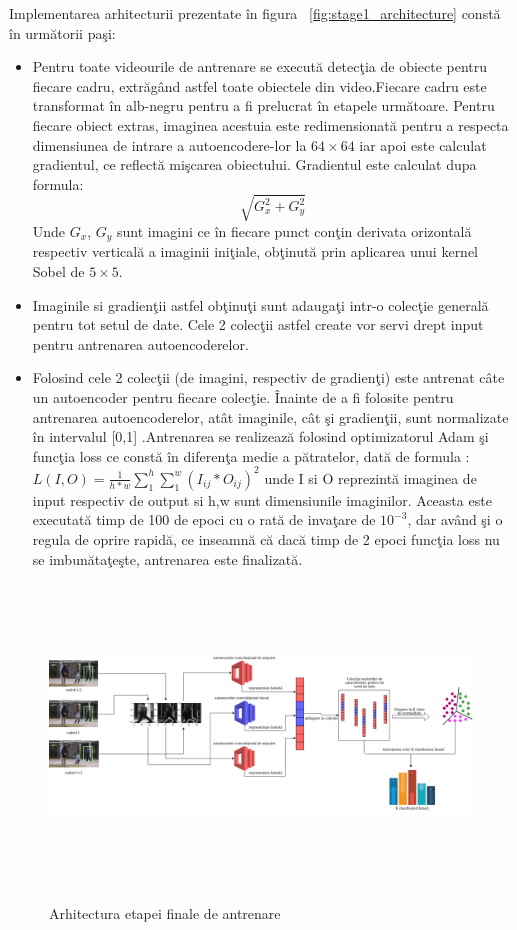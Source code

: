 \documentclass[a4paper,12pt]{report}
\begin{document}
\par
Implementarea arhitecturii prezentate în figura ~\ref{fig:stage1_architecture} constă în următorii paşi:
\begin {itemize}
\item Pentru toate videourile de antrenare se execută detecţia de obiecte pentru fiecare cadru, extrăgând astfel toate obiectele din video.Fiecare cadru este transformat în alb-negru pentru a fi prelucrat în etapele următoare. Pentru fiecare obiect extras, imaginea acestuia este redimensionată pentru a respecta dimensiunea de intrare a autoencodere-lor la \( 64 \times 64 \) iar apoi este calculat gradientul, ce reflectă mişcarea obiectului. Gradientul este calculat dupa formula: \[\sqrt{G_{x}^2 + G_{y}^2}\] Unde \(G_{x}\), \(G_{y}\) sunt imagini ce în fiecare punct conţin derivata orizontală respectiv verticală a imaginii iniţiale, obţinută prin aplicarea unui kernel Sobel de \(5 \times 5 \).
\item Imaginile si gradienţii astfel obţinuţi sunt adaugaţi intr-o colecţie generală pentru tot setul de date. Cele 2 colecţii astfel create vor servi drept input pentru antrenarea autoencoderelor.
\item Folosind cele 2 colecţii (de imagini, respectiv de gradienţi) este antrenat câte un autoencoder pentru fiecare colecţie. Înainte de a fi folosite pentru antrenarea autoencoderelor, atât imaginile, cât şi gradienţii, sunt normalizate în intervalul [0,1] .Antrenarea se realizează folosind optimizatorul Adam \cite{adam2017} şi funcţia loss ce constă în diferenţa medie a pătratelor, dată de formula : 
\(L(I,O) = \frac{1} {h*w} \sum_{1}^{h} \sum_{1}^{w} (I_{ij} * O_{ij})^2 \)   \cite{ionescu2019object} unde I si O reprezintă imaginea de input respectiv de output si h,w sunt dimensiunile imaginilor. Aceasta este executată timp de 100 de epoci cu o rată de invaţare de \(10^{-3}\), dar având şi o regula de oprire rapidă, ce inseamnă că dacă timp de 2 epoci funcţia loss nu se imbunătaţeşte, antrenarea este finalizată.
\end{itemize}

\begin{figure}[h]
\begin{center}
        \includegraphics[width=1\textwidth,height=8cm]{images/training_stage2_architecture}
			 \label{fig:stage2_architecture}
			 \caption{Arhitectura etapei finale de antrenare}
\end{center}
\end{figure}
\end{document}
